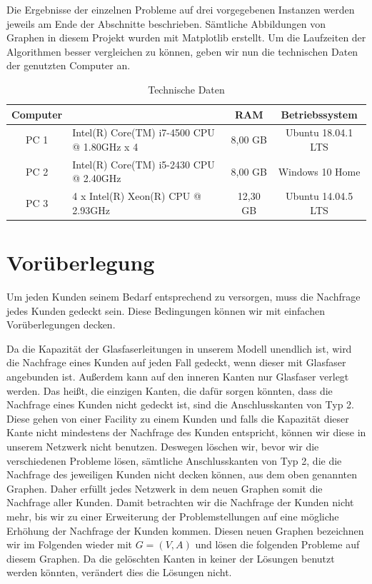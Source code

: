 \documentclass[11pt,a4paper]{article}
\theoremstyle{my_th_style1}
\begin{document}
Die Ergebnisse der einzelnen Probleme auf drei vorgegebenen Instanzen werden jeweils am Ende der Abschnitte beschrieben.
S\"amtliche Abbildungen von Graphen in diesem Projekt wurden mit Matplotlib \cite{Hunter:2007} erstellt.
Um die Laufzeiten der Algorithmen besser vergleichen zu können, geben wir nun die technischen Daten der genutzten Computer an.
\begin{table}[h]
	\centering
	\begin{tabular}{|c|p{5.5cm}|c|c|}
		\hline
		Computer & \centering{Prozessor} & RAM & Betriebssystem \\	
		\hline
		PC 1 &Intel(R) Core(TM) i7-4500 CPU @ 1.80GHz x 4 & 8,00 GB & Ubuntu 18.04.1 LTS\\
		PC 2 & Intel(R) Core(TM) i5-2430 CPU @ 2.40GHz & 8,00 GB & Windows 10 Home \\
		PC 3 & 4 x Intel(R) Xeon(R) CPU @ 2.93GHz  & 12,30 GB & Ubuntu 14.04.5 LTS  \\
		\hline 
	\end{tabular}
	\caption{Technische Daten} 
\end{table}

\section{Vorüberlegung}
\label{preprocess}

Um jeden Kunden seinem Bedarf entsprechend zu versorgen, muss die Nachfrage jedes Kunden gedeckt sein.
Diese Bedingungen k\"onnen wir mit einfachen Vor\"uberlegungen decken.

Da die Kapazität der Glasfaserleitungen in unserem Modell unendlich ist, wird die Nachfrage eines Kunden auf jeden Fall gedeckt, wenn dieser mit Glasfaser angebunden ist.
Außerdem kann auf den inneren Kanten nur Glasfaser verlegt werden.
Das heißt, die einzigen Kanten, die dafür sorgen könnten, dass die Nachfrage eines Kunden nicht gedeckt ist, sind die Anschlusskanten von Typ 2.
Diese gehen von einer Facility zu einem Kunden und falls die Kapazit\"at dieser Kante nicht mindestens der Nachfrage des Kunden entspricht, können wir diese in unserem Netzwerk nicht benutzen. 
Deswegen löschen wir, bevor wir die verschiedenen Probleme lösen, s\"amtliche Anschlusskanten von Typ 2, die die Nachfrage des jeweiligen Kunden nicht decken k\"onnen, aus dem oben genannten Graphen.
Daher erf\"ullt jedes Netzwerk in dem neuen Graphen somit die Nachfrage aller Kunden.
Damit betrachten wir die Nachfrage der Kunden nicht mehr, bis wir zu einer Erweiterung der Problemstellungen auf eine m\"ogliche Erh\"ohung der Nachfrage der Kunden kommen.
Diesen neuen Graphen bezeichnen wir im Folgenden wieder mit $G=(V,A)$ und lösen die folgenden Probleme auf diesem Graphen.
Da die gelöschten Kanten in keiner der Lösungen benutzt werden könnten, verändert dies die Lösungen nicht.
\end{document}
